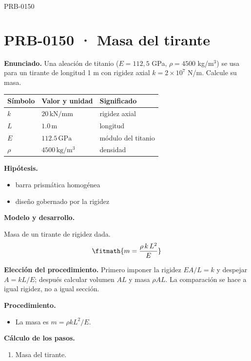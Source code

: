 \begin{studiumworked}{PRB-0150}

\section{PRB-0150 · Masa del tirante}

\textbf{Enunciado.} Una aleación de titanio ($E = 112{,}5$ GPa, $\rho = 4500$ kg/m$^3$) se usa para un tirante de longitud 1 m con rigidez axial $k = 2\times 10^{7}$ N/m. Calcule su masa.

\par\medskip\noindent\begin{tabular}{@{}p{.18\linewidth}p{.26\linewidth}p{.48\linewidth}@{}}
\toprule Símbolo & Valor y unidad & Significado\\\midrule
$k$ & $20\,\mathrm{kN/mm}$ & rigidez axial\\
$L$ & $1.0\,\mathrm{m}$ & longitud\\
$E$ & $112.5\,\mathrm{GPa}$ & módulo del titanio\\
$\rho$ & $4500\,\mathrm{kg/m^3}$ & densidad\\
\bottomrule\end{tabular}\par\medskip

\textbf{Hipótesis.}\begin{itemize}\item barra prismática homogénea
\item diseño gobernado por la rigidez\end{itemize}

\textbf{Modelo y desarrollo.}

Masa de un tirante de rigidez dada.\[\fitmath{m = \frac{\rho\,k\,L^{2}}{E}}\]

\textbf{Elección del procedimiento.} Primero imponer la rigidez $EA/L=k$ y despejar $A=kL/E$; después calcular volumen $AL$ y masa $\rho AL$. La comparación se hace a igual rigidez, no a igual sección.

\textbf{Procedimiento.}\begin{itemize}\item La masa es $m = \rho k L^2/E$.\end{itemize}

\textbf{Cálculo de los pasos.}

\begin{enumerate}

\item Masa del tirante.


\end{enumerate}
\end{studiumworked}
